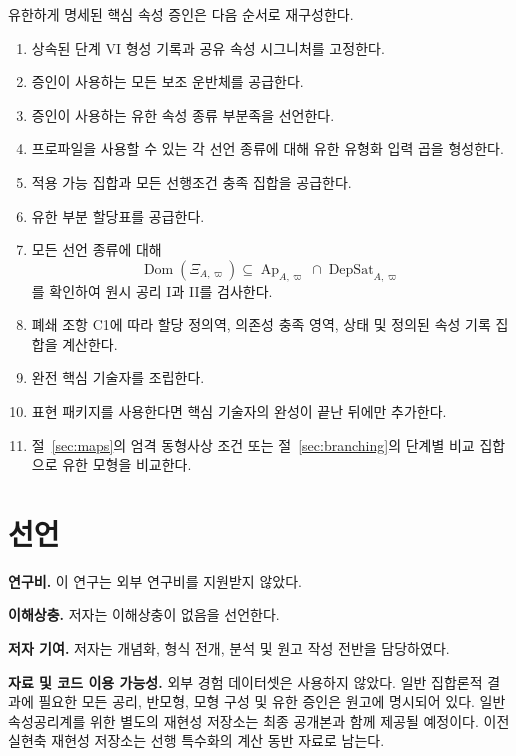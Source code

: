 \documentclass[11pt]{article}
\newcommand{\Ap}{\operatorname{Ap}}
\newcommand{\DepSat}{\operatorname{DepSat}}
\newcommand{\Dom}{\operatorname{Dom}}
\theoremstyle{definition}
\theoremstyle{remark}
\begin{document}
유한하게 명세된 핵심 속성 증인은 다음 순서로 재구성한다.
\begin{enumerate}
\item 상속된 단계 VI 형성 기록과 공유 속성 시그니처를 고정한다.
\item 증인이 사용하는 모든 보조 운반체를 공급한다.
\item 증인이 사용하는 유한 속성 종류 부분족을 선언한다.
\item 프로파일을 사용할 수 있는 각 선언 종류에 대해 유한 유형화 입력 곱을 형성한다.
\item 적용 가능 집합과 모든 선행조건 충족 집합을 공급한다.
\item 유한 부분 할당표를 공급한다.
\item 모든 선언 종류에 대해
\[
\Dom(\Xi_{A,\varpi})
\subseteq
\Ap_{A,\varpi}\cap\DepSat_{A,\varpi}
\]
를 확인하여 원시 공리 I과 II를 검사한다.
\item 폐쇄 조항 C1에 따라 할당 정의역, 의존성 충족 영역, 상태 및 정의된 속성 기록 집합을 계산한다.
\item 완전 핵심 기술자를 조립한다.
\item 표현 패키지를 사용한다면 핵심 기술자의 완성이 끝난 뒤에만 추가한다.
\item 절~\ref{sec:maps}의 엄격 동형사상 조건 또는 절~\ref{sec:branching}의 단계별 비교 집합으로 유한 모형을 비교한다.
\end{enumerate}

\section*{선언}

\noindent\textbf{연구비.} 이 연구는 외부 연구비를 지원받지 않았다.

\noindent\textbf{이해상충.} 저자는 이해상충이 없음을 선언한다.

\noindent\textbf{저자 기여.} 저자는 개념화, 형식 전개, 분석 및 원고 작성 전반을 담당하였다.

\noindent\textbf{자료 및 코드 이용 가능성.} 외부 경험 데이터셋은 사용하지 않았다.
일반 집합론적 결과에 필요한 모든 공리, 반모형, 모형 구성 및 유한 증인은 원고에 명시되어 있다.
일반 속성공리계를 위한 별도의 재현성 저장소는 최종 공개본과 함께 제공될 예정이다.
이전 실현축 재현성 저장소는 선행 특수화의 계산 동반 자료로 남는다.
\end{document}
